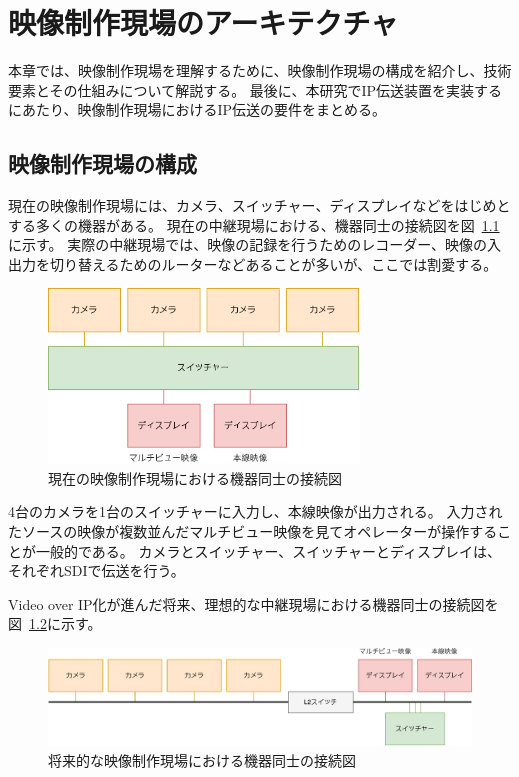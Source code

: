 \chapter{映像制作現場のアーキテクチャ}
\label{chap:video-production}

本章では、映像制作現場を理解するために、映像制作現場の構成を紹介し、技術要素とその仕組みについて解説する。
最後に、本研究でIP伝送装置を実装するにあたり、映像制作現場におけるIP伝送の要件をまとめる。

\section{映像制作現場の構成}

現在の映像制作現場には、カメラ、スイッチャー、ディスプレイなどをはじめとする多くの機器がある。
現在の中継現場における、機器同士の接続図を図~\ref{fig:broadcast-diagram-on-sdi}に示す。
実際の中継現場では、映像の記録を行うためのレコーダー、映像の入出力を切り替えるためのルーターなどあることが多いが、ここでは割愛する。

\begin{figure}[htbp]
  \begin{center}
    \includegraphics[bb=0 0 431 242,width=8.233cm]{img/broadcast-diagram-on-sdi.pdf}
  \end{center}
  \caption{現在の映像制作現場における機器同士の接続図}
  \label{fig:broadcast-diagram-on-sdi}
\end{figure}

4台のカメラを1台のスイッチャーに入力し、本線映像が出力される。
入力されたソースの映像が複数並んだマルチビュー映像を見てオペレーターが操作することが一般的である。
カメラとスイッチャー、スイッチャーとディスプレイは、それぞれSDIで伝送を行う。

Video over IP化が進んだ将来、理想的な中継現場における機器同士の接続図を図~\ref{fig:broadcast-diagram-on-ip}に示す。

\begin{figure}[htbp]
  \begin{center}
    \includegraphics[bb=0 0 787 182,width=15cm]{img/broadcast-diagram-on-ip.pdf}
  \end{center}
  \caption{将来的な映像制作現場における機器同士の接続図}
  \label{fig:broadcast-diagram-on-ip}
\end{figure}

